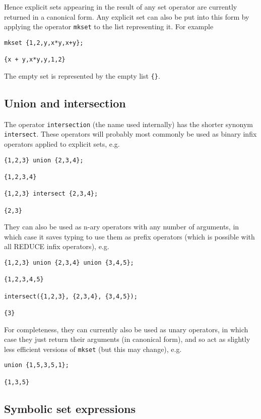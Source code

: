 Hence explicit sets appearing in the result of any set operator are
currently returned in a canonical form.  Any explicit set can also be
put into this form by applying the operator {\tt mkset} to the list
representing it.  For example
\begin{verbatim}
mkset {1,2,y,x*y,x+y};

{x + y,x*y,y,1,2}
\end{verbatim}

The empty set is represented by the empty list \verb|{}|.


\subsection{Union and intersection}

The operator {\tt intersection} (the name used internally) has the
shorter synonym {\tt intersect}.  These operators will probably most
commonly be used as binary infix operators applied to explicit sets,
e.g.
\begin{verbatim}
{1,2,3} union {2,3,4};

{1,2,3,4}

{1,2,3} intersect {2,3,4};

{2,3}
\end{verbatim}
They can also be used as n-ary operators with any number of arguments,
in which case it saves typing to use them as prefix operators (which
is possible with all REDUCE infix operators), e.g.
\begin{verbatim}
{1,2,3} union {2,3,4} union {3,4,5};

{1,2,3,4,5}

intersect({1,2,3}, {2,3,4}, {3,4,5});

{3}
\end{verbatim}
For completeness, they can currently also be used as unary operators,
in which case they just return their arguments (in canonical form),
and so act as slightly less efficient versions of {\tt mkset} (but
this may change), e.g.
\begin{verbatim}
union {1,5,3,5,1};

{1,3,5}
\end{verbatim}


\subsection{Symbolic set expressions}

